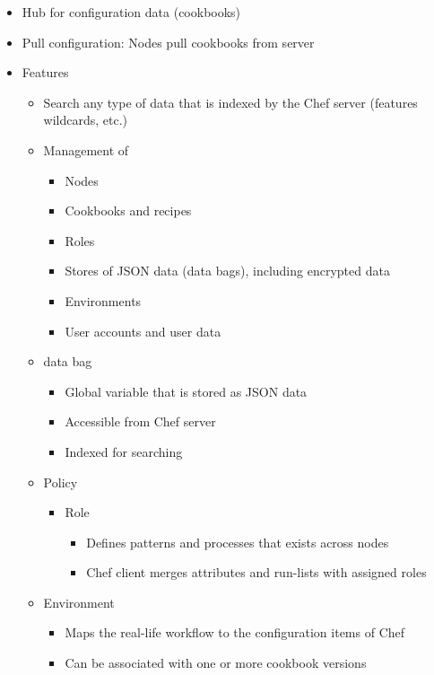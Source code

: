\begin{itemize}
\begin{itemize}
\begin{itemize}
						\item Hub for configuration data (cookbooks)
						\item Pull configuration: Nodes pull cookbooks from server
						\item Features
							\begin{itemize}
								\item Search any type of data that is indexed by the Chef server (features wildcards, etc.)
								\item Management of
								\begin{itemize}
									\item Nodes
									\item Cookbooks and recipes
									\item Roles
									\item Stores of JSON data (data bags), including encrypted data
									\item Environments
									\item User accounts and user data
								\end{itemize}
								\item data bag
									\begin{itemize}
										\item Global variable that is stored as JSON data
										\item Accessible from Chef server
										\item Indexed for searching
									\end{itemize}
								\item Policy
									 \begin{itemize}
									 	\item Role
										 	\begin{itemize}
										 		\item Defines patterns and processes that exists across nodes
										 		\item Chef client merges attributes and run-lists with assigned roles
										 	\end{itemize}
									 \end{itemize}
								\item Environment
									\begin{itemize}
										\item Maps the real-life workflow to the configuration items of Chef
										\item Can be associated with one or more cookbook versions
									\end{itemize}

\end{itemize}
\end{itemize}
\end{itemize}
\end{itemize}
